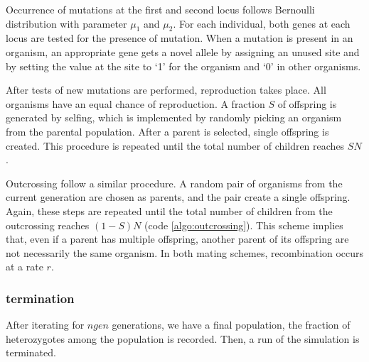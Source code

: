 \documentclass[12pt]{article}
\begin{document}
Occurrence of mutations at the first and second locus follows
Bernoulli distribution with parameter \(\mu_{1}\) and \(\mu_{2}\).
For each individual, both genes at each locus are tested for the
presence of mutation.
When a mutation is present in an organism, an appropriate gene gets
a novel allele by assigning an unused site and by setting the value at
the site to `1' for the organism and `0' in other organisms.

After tests of new mutations are performed, reproduction takes place.
All organisms have an equal chance of reproduction.
A fraction \(S\) of offspring is generated by selfing, which is
implemented by randomly picking an organism from the parental
population.
After a parent is selected, single offspring is created.
This procedure is repeated until the total number of children reaches
\(S N\).

Outcrossing follow a similar procedure.
A random pair of organisms from the current generation are chosen as
parents, and the pair create a single offspring.
Again, these steps are repeated until the total number of children from
the outcrossing reaches \((1 - S)N\) (code \ref{algo:outcrossing}).
This scheme implies that, even if a parent has multiple offspring,
another parent of its offspring are not necessarily the same
organism.
In both mating schemes, recombination occurs at a rate \(r\).

\subsubsection{termination}
\label{sec:termination}

After iterating for \(ngen\) generations, we have a final population,
the fraction of heterozygotes among the population is recorded.
Then, a run of the simulation is terminated.
\end{document}
